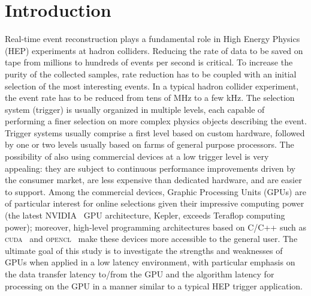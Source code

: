 \documentclass[letterpaper]{jpconf}
\begin{document}
\section{Introduction}
Real-time event reconstruction plays a fundamental role in High Energy
Physics (HEP) experiments at hadron colliders.  Reducing the rate of
data to be saved on tape from millions to hundreds of events per
second is critical. To increase the purity of the collected samples,
rate reduction has to be coupled with an initial selection of the most
interesting events.  In a typical hadron collider experiment, the
event rate has to be reduced from tens of MHz to a few kHz.  The
selection system (trigger) is usually organized in multiple levels,
each capable of performing a finer selection on more complex physics
objects describing the event. Trigger systems usually comprise a first
level based on custom hardware, followed by one or two levels usually
based on farms of general purpose processors.  The possibility of also
using commercial devices at a low trigger level is very appealing:
they are subject to continuous performance improvements driven by the
consumer market, are less expensive than dedicated hardware, and are
easier to support.  Among the commercial devices, Graphic Processing
Units (GPUs) are of particular interest for online selections given
their impressive computing power (the latest NVIDIA~\cite{bib_nvidia}
GPU architecture, Kepler, exceeds Teraflop computing power); moreover,
high-level programming architectures based on C/C++ such as
\textsc{cuda}~\cite{bib_cuda} and \textsc{opencl}~\cite{bib_opencl}
make these devices more accessible to the general user.  The ultimate
goal of this study is to investigate the strengths and weaknesses of
GPUs when applied in a low latency environment, with particular
emphasis on the data transfer latency to/from the GPU and the
algorithm latency for processing on the GPU in a manner similar to a
typical HEP trigger application.
\end{document}
